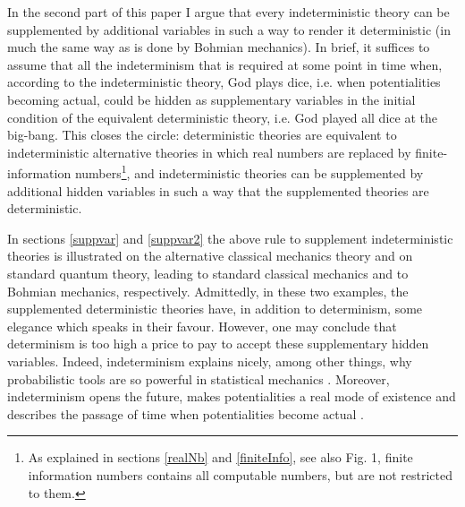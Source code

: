 \documentclass[pra,aps,groupedaddress,twocolumn,floatfix,nofootinbib]{revtex4}
\begin{document}
In the second part of this paper I argue that every indeterministic theory can be supplemented by additional variables in such a way to render it deterministic (in much the same way as is done by Bohmian mechanics). In brief, it suffices to assume that all the indeterminism that is required at some point in time when, according to the indeterministic theory, God plays dice, i.e. when potentialities becoming actual, could be hidden as supplementary variables in the initial condition of the equivalent deterministic theory, i.e. God played all dice at the big-bang. This closes the circle: deterministic theories are equivalent to indeterministic alternative theories in which real numbers are replaced by finite-information numbers\footnote{As explained in sections \ref{realNb} and \ref{finiteInfo}, see also Fig. 1, finite information numbers contains all computable numbers, but are not restricted to them.}, and indeterministic theories can be supplemented by additional hidden variables in such a way that the supplemented theories are deterministic. %

In sections \ref{suppvar} and \ref{suppvar2} the above rule to supplement indeterministic theories is illustrated on the alternative classical mechanics theory and on standard quantum theory, leading to standard classical mechanics and to Bohmian mechanics, respectively. Admittedly, in these two examples, the supplemented deterministic theories have, in addition to determinism, some elegance which speaks in their favour. However, one may conclude that determinism is too high a price to pay to accept these supplementary hidden variables. Indeed, indeterminism explains nicely, among other things, why probabilistic tools are so powerful in statistical mechanics \cite{Drossel}. Moreover, indeterminism opens the future, makes potentialities a real mode of existence and describes the passage of time when potentialities become actual \cite{NortonTimePasses,Dolev18}.
\end{document}
